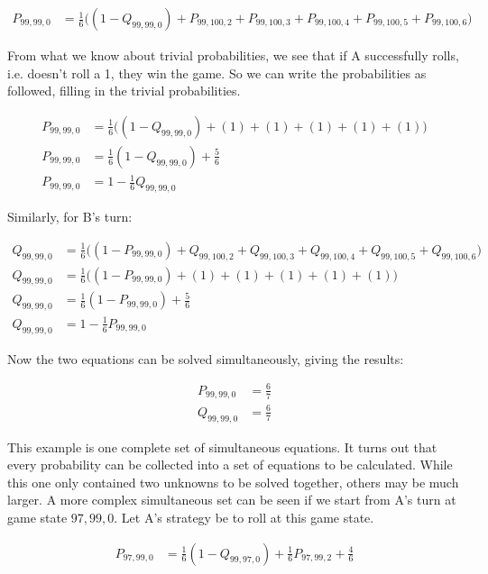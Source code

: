\documentclass[a4paper,titlepage]{article}
\begin{document}
\begin{align*}
	P_{99,99,0} &= \frac{1}{6}\bigg((1 - Q_{99,99,0}) + P_{99,100,2} + P_{99,100,3} + P_{99,100,4} + P_{99,100,5} + P_{99,100,6}\bigg)
\end{align*}

From what we know about trivial probabilities, we see that if A successfully rolls, i.e. doesn't roll a 1, they win the game. So we can write the probabilities as followed, filling in the trivial probabilities.

\begin{align*}
	P_{99,99,0} &= \frac{1}{6}\bigg((1 - Q_{99,99,0}) + (1) + (1) + (1) + (1) + (1)\bigg)\\
	P_{99,99,0} &= \frac{1}{6}(1 - Q_{99,99,0})+\frac{5}{6}\\
	P_{99,99,0} &= 1 - \frac{1}{6}Q_{99,99,0}
\end{align*}

Similarly, for B's turn:

\begin{align*}
	Q_{99,99,0} &= \frac{1}{6}\bigg((1 - P_{99,99,0}) + Q_{99,100,2} + Q_{99,100,3} + Q_{99,100,4} + Q_{99,100,5} + Q_{99,100,6}\bigg)\\
	Q_{99,99,0} &= \frac{1}{6}\bigg((1 - P_{99,99,0}) + (1) + (1) + (1) + (1) + (1)\bigg)\\
	Q_{99,99,0} &= \frac{1}{6}(1 - P_{99,99,0})+\frac{5}{6}\\
	Q_{99,99,0} &= 1 - \frac{1}{6}P_{99,99,0}
\end{align*}

Now the two equations can be solved simultaneously, giving the results:

\begin{align*}
	P_{99,99,0} &= \frac{6}{7}\\
	Q_{99,99,0} &= \frac{6}{7}
\end{align*}

This example is one complete set of simultaneous equations. It turns out that every probability can be collected into a set of equations to be calculated. While this one only contained two unknowns to be solved together, others may be much larger. A more complex simultaneous set can be seen if we start from A's turn at game state $97,99,0$. Let A's strategy be to roll at this game state.

\begin{align*}
	P_{97,99,0} &= \frac{1}{6}(1 - Q_{99,97,0})+\frac{1}{6}P_{97,99,2}+\frac{4}{6}\\
\end{align*}
\end{document}
